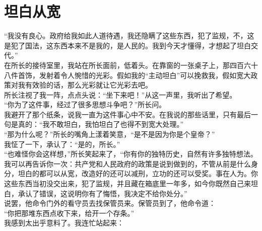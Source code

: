 \fancyhead[RO]{} %
\fancyhead[LE]{} %
\chapter*{坦白从宽}
\thispagestyle{empty}
“我没有良心。政府给我如此人道待遇，我还隐瞒了这些东西，犯了监规，不，这是犯了国法，这东西本来不是我的，是人民的。我到今天才懂得，才想起了坦白交代。”\\

在所长的接待室里，我站在所长面前，低着头。在靠窗的一张桌子上，那四百六十八件首饰，发射着令人惋惜的光彩。假如我的“主动坦白”可以挽救我，假如宽大政策对我有效验的话，那么光彩就让它光彩去吧。\\

所长注视了我一阵，点点头说：“坐下来吧！”从这一声里，我听出了希望。\\

“你为了这件事，经过了很多思想斗争吧？”所长问。\\

我避开了那个纸条，说我一直为这件事心中不安。在我说的那些话里，只有最后一句是真的：“我不敢坦白，我怕坦白了也得不到宽大处理。”\\

“那为什么呢？”所长的嘴角上漾着笑意，“是不是因为你是个皇帝？”\\

我怔了一下，承认了：“是的，所长。”\\

“也难怪你会这样想，”所长笑起来了，“你有你的独特历史，自然有许多独特想法。我可以再告诉你一次：共产党和人民政府的政策是说到做到的，不管从前是什么身分，坦白的都可以从宽，改造好的还可以减刑，立功的还可以受奖。事在人为。你这些东西当初没交出来，犯了监规，并且藏在箱底里一年多，如今你既然自己来坦白，承认了错误，这说明你有了悔悟，我决定不给你处分。”\\

说罢，他命令门外的看守员去找保管员来。保管员到了，他命令道：\\

“你把那堆东西点收下来，给开一个存条。”\\

我感到太出乎意料了。我连忙站起来：\\


